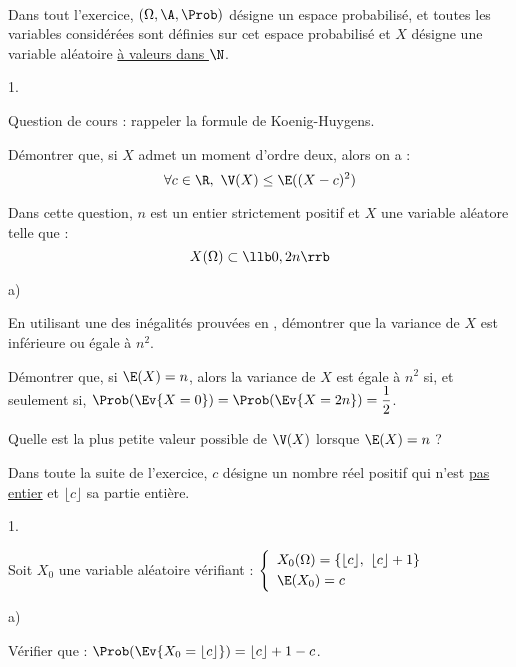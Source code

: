 \begin{exerciceAP}~\\
  Dans tout l'exercice, $(\Omega, \A, \Prob)$ désigne un espace 
  probabilisé, et toutes les variables considérées sont définies sur 
  cet espace probabilisé et $X$ désigne une variable aléatoire 
  \underline{à valeurs dans $\N$}.
  \begin{noliste}{1.}
    \setlength{\itemsep}{2mm}
    \item Question de cours : rappeler la formule de Koenig-Huygens.
    
    \item Démontrer que, si $X$ admet un moment d'ordre deux, alors 
    on a :
    \[
      \forall c \in \R, \ \V(X) \leq \E((X-c)^2)
    \]
  \end{noliste}
  
  \item Dans cette question, $n$ est un entier strictement positif et 
  $X$ une variable aléatore telle que :
  \[
    X(\Omega) \subset \llb 0, 2n \rrb
  \]
  \begin{noliste}{a)}
    \setlength{\itemsep}{2mm}
    \item En utilisant une des inégalités prouvées en , 
    démontrer que la variance de $X$ est inférieure ou égale à $n^2$.
    
    \item Démontrer que, si $\E(X) = n$, alors la variance de $X$ est 
    égale à $n^2$ si, et seulement si, $\Prob(\Ev{X=0}) = 
    \Prob(\Ev{X=2n}) = \dfrac{1}{2}$.
    
    \item Quelle est la plus petite valeur possible de $\V(X)$ 
    lorsque $\E(X)=n$ ?
  \end{noliste}
  
  \noindent
  Dans toute la suite de l'exercice, $c$ désigne un nombre réel positif
  qui n'est \underline{pas entier} et $\lfloor c \rfloor$ sa partie 
  entière.
  \begin{noliste}{1.}
    \setlength{\itemsep}{2mm}
    \setcounter{enumi}{2}
    \item Soit $X_0$ une variable aléatoire vérifiant : $\left\{
    \begin{array}{l}
      X_0(\Omega) = \{ \lfloor c \rfloor, \ \lfloor c \rfloor 
      +1\}\\[.1cm]
      \E(X_0) = c
    \end{array}
    \right.$
    \begin{noliste}{a)}
    \setlength{\itemsep}{2mm}
      \item Vérifier que : $\Prob(\Ev{X_0 = \lfloor c \rfloor }) =
      \lfloor c \rfloor +1-c$.
      

\end{noliste}
\end{noliste}
\end{exerciceAP}
